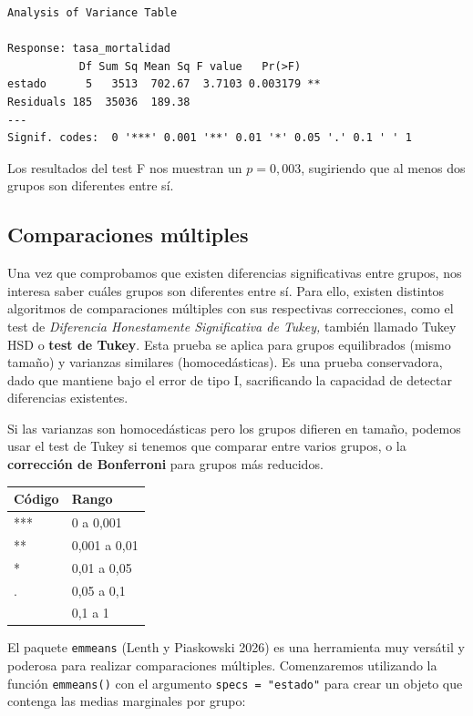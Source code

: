 \documentclass[
  spanish,
  a4paper,
]{scrbook}
\newcounter{none} %
\begin{document}
\begin{verbatim}
Analysis of Variance Table

Response: tasa_mortalidad
           Df Sum Sq Mean Sq F value   Pr(>F)   
estado      5   3513  702.67  3.7103 0.003179 **
Residuals 185  35036  189.38                    
---
Signif. codes:  0 '***' 0.001 '**' 0.01 '*' 0.05 '.' 0.1 ' ' 1
\end{verbatim}

Los resultados del test F nos muestran un \(p = 0,003\), sugiriendo que
al menos dos grupos son diferentes entre sí.

\subsection{Comparaciones múltiples}\label{comparaciones-muxfaltiples}

Una vez que comprobamos que existen diferencias significativas entre
grupos, nos interesa saber cuáles grupos son diferentes entre sí. Para
ello, existen distintos algoritmos de comparaciones múltiples con sus
respectivas correcciones, como el test de \emph{Diferencia Honestamente
Significativa de Tukey,} también llamado Tukey HSD o \textbf{test de
Tukey}. Esta prueba se aplica para grupos equilibrados (mismo tamaño) y
varianzas similares (homocedásticas). Es una prueba conservadora, dado
que mantiene bajo el error de tipo I, sacrificando la capacidad de
detectar diferencias existentes.

Si las varianzas son homocedásticas pero los grupos difieren en tamaño,
podemos usar el test de Tukey si tenemos que comparar entre varios
grupos, o la \textbf{corrección de Bonferroni} para grupos más
reducidos.

{\def\LTcaptype{none} %
\begin{longtable}[]{@{}ll@{}}
\toprule\noalign{}
Código & Rango \\
\midrule\noalign{}
\endhead
\bottomrule\noalign{}
\endlastfoot
*** & 0 a 0,001 \\
** & 0,001 a 0,01 \\
* & 0,01 a 0,05 \\
. & 0,05 a 0,1 \\
& 0,1 a 1 \\
\end{longtable}
}

El paquete \texttt{emmeans} (Lenth y Piaskowski 2026) es una herramienta
muy versátil y poderosa para realizar comparaciones múltiples.
Comenzaremos utilizando la función \texttt{emmeans()} con el argumento
\texttt{specs\ =\ "estado"} para crear un objeto que contenga las medias
marginales por grupo:
\end{document}
